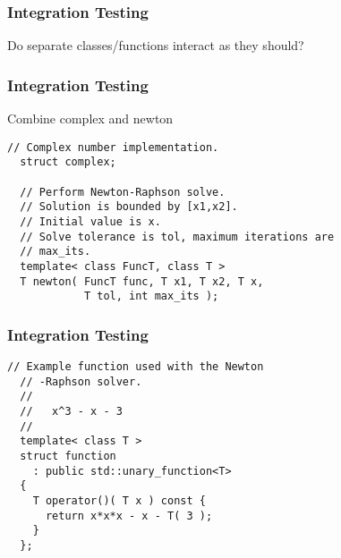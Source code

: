 \begin{frame}
  \frametitle{Integration Testing}
  \vspace{4cm}
  {\Large\color{Base09}Do separate classes/functions interact as they should?}
\end{frame}

\begin{frame}[fragile]
  \frametitle{Integration Testing}
  \begin{block}{Combine complex and newton}
    \begin{lstlisting}[style=C]
  // Complex number implementation.
  struct complex;

  // Perform Newton-Raphson solve.
  // Solution is bounded by [x1,x2].
  // Initial value is x.
  // Solve tolerance is tol, maximum iterations are
  // max_its.
  template< class FuncT, class T >
  T newton( FuncT func, T x1, T x2, T x,
            T tol, int max_its );
    \end{lstlisting}
  \end{block}
\end{frame}

\begin{frame}[fragile]
  \frametitle{Integration Testing}
  \begin{example}
    \begin{lstlisting}[style=C]
  // Example function used with the Newton
  // -Raphson solver.
  //
  //   x^3 - x - 3
  //
  template< class T >
  struct function
    : public std::unary_function<T>
  {
    T operator()( T x ) const {
      return x*x*x - x - T( 3 );
    }
  };
    \end{lstlisting}
  \end{example}
\end{frame}


